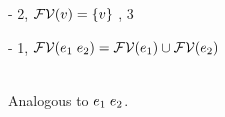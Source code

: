 \begin{bycase}
\Case{$\opO$, $\descopO$, $\pjop{\fnam}$}
\begin{derivation}
\stepO{\cvarvO{\expr}=\emptyset}
      {}
\stepO{\esbsO{\expr}=\expr}
      {}
\end{derivation}
\Case{$\var$}
\begin{derivation}
\step{\cvarvO{\var}=\emptyset}
     {}
\step{\varI\not\in\efvar{\var}}
     {\hyp}
\step{\varI\neq\var}
     {2, $\mathcal{FV}(v)=\{v\}$}
\step{\esbsO{\var}=\var}
     {, 3}
\end{derivation}
\Case{$\appO$}
\begin{derivation}
\step{\varI\not\in\efvar{\appO}}
     {\hyp}
     {1, $\mathcal{FV}(e_1\;e_2)=\mathcal{FV}(e_1)\cup\mathcal{FV}(e_2)$}
\end{derivation}
\Case{$\eqO$, $\iifO$}\\
Analogous to $\appO$.
\Case{$\absO$}
\begin{derivation}
\step{\varI\not\in\efvar{\absO}}

\end{derivation}
\end{bycase}
